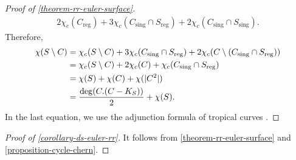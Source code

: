 \documentclass[a4paper,dvipdfmx,reqno,12pt]{amsart}
\theoremstyle{definition}
\newcommand{\opn}[1]{\operatorname{#1}}
\numberwithin{equation}{section}
\begin{document}
\begin{proof}[{Proof of \cref{theorem-rr-euler-surface}}]
\begin{align}
2\chi_c(C_{\mathrm{reg}})+
3\chi_c(C_{\mathrm{sing}}\cap S_{\mathrm{reg}})+
2\chi_c(C_{\mathrm{sing}}\cap S_{\mathrm{sing}}).
\end{align}
Therefore, 
\begin{align}
\label{equation-euler-calculus}
\chi(S\setminus C)&=
\chi_c(S\setminus C)+
3\chi_c(C_{\mathrm{sing}}
\cap S_{\mathrm{reg}})+
2\chi_c(C\setminus (C_{\mathrm{sing}}
\cap S_{\mathrm{reg}}))\\
&=\chi_c(S\setminus C)+2\chi_c(C)+
\chi_c(C_{\mathrm{sing}}
\cap S_{\mathrm{reg}}) \notag \\
&=\chi(S)+\chi(C)+\chi(|C^2|) 
\label{equation-iterated-euler} \\
&=\frac{\opn{deg}(C. (C-K_S))}{2}+\chi(S). \notag
\end{align}
In the last equation, we use the adjunction formula of tropical
curves \cite[Theorem 4.11]{shaw2015tropical}.
\end{proof}


\begin{proof}[{Proof of \cref{corollary-ds-euler-rr}}]
It follows from
\cref{theorem-rr-euler-surface} and
\cref{proposition-cycle-chern}.
\end{proof}
\end{document}
